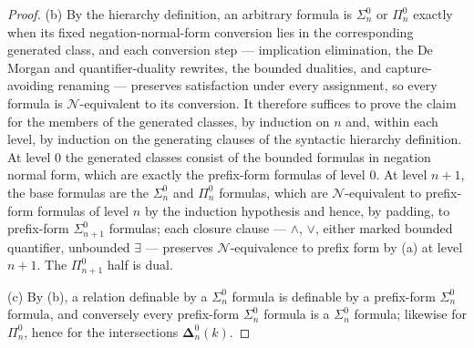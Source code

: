 \begin{proof}
(b) By the hierarchy definition, an arbitrary formula is \(\Sigma^0_n\)
or \(\Pi^0_n\) exactly when its fixed negation-normal-form conversion
lies in the corresponding generated class, and each conversion step ---
implication elimination, the De Morgan and quantifier-duality rewrites,
the bounded dualities, and capture-avoiding renaming --- preserves
satisfaction under every assignment, so every formula is
\(\mathcal N\)-equivalent to its conversion.  It therefore suffices to
prove the claim for the members of the generated classes, by induction on
\(n\) and, within each level, by induction on the generating clauses of
the syntactic hierarchy definition.  At level \(0\) the generated classes
consist of the bounded formulas in negation normal form, which are
exactly the prefix-form formulas of level \(0\).  At level \(n+1\), the
base formulas are the
\(\Sigma^0_n\) and \(\Pi^0_n\) formulas, which are
\(\mathcal N\)-equivalent to prefix-form formulas of level \(n\) by the
induction hypothesis and hence, by padding, to prefix-form
\(\Sigma^0_{n+1}\) formulas; each closure clause --- \(\land\), \(\lor\),
either marked bounded quantifier, unbounded \(\exists\) --- preserves
\(\mathcal N\)-equivalence to prefix form by (a) at level \(n+1\).  The
\(\Pi^0_{n+1}\) half is dual.

(c) By (b), a relation definable by a \(\Sigma^0_n\) formula is definable
by a prefix-form \(\Sigma^0_n\) formula, and conversely every prefix-form
\(\Sigma^0_n\) formula is a \(\Sigma^0_n\) formula; likewise for
\(\Pi^0_n\), hence for the intersections \(\boldsymbol{\Delta}^0_n(k)\).
\end{proof}

